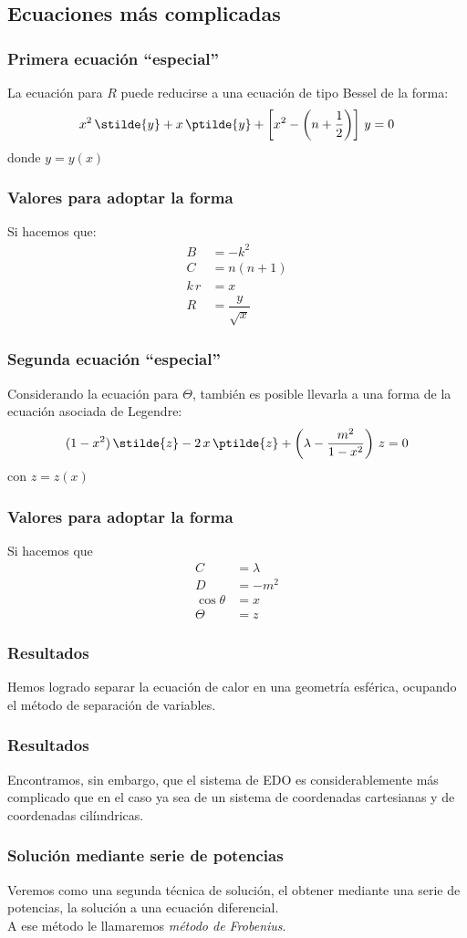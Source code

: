 \subsection{Ecuaciones más complicadas}
\begin{frame}
\frametitle{Primera ecuación \enquote{especial}}
La ecuación para $R$ puede reducirse a una ecuación de tipo Bessel de la forma:
\begin{align}
x^{2} \, \stilde{y} + x \, \ptilde{y} + \left[ x^{2} - \left( n + \dfrac{1}{2} \right) \right] \, y = 0
\label{eq:ecuacion_02_304}
\end{align}
donde $y = y(x)$
\end{frame}
\begin{frame}
\frametitle{Valores para adoptar la forma}
Si hacemos que:
\begin{align*}
B &= -k^{2} \\[0.5em]
C &= n(n + 1) \\[0.5em]
k \, r &= x \\[0.5em]
R &= \dfrac{y}{\sqrt{x}}
\end{align*}
\end{frame}
\begin{frame}
\frametitle{Segunda ecuación \enquote{especial}}
Considerando la ecuación para $\Theta$, también es posible llevarla a una forma de la ecuación asociada de Legendre:
\begin{align*}
(1 - x^{2}) \, \stilde{z} - 2 \, x \, \ptilde{z} + \left( \lambda - \dfrac{m^{2}}{1 -x^{2}} \right) \, z = 0
\label{eq:ecuacion_02_305}
\end{align*}
con $z = z(x)$
\end{frame}
\begin{frame}
\frametitle{Valores para adoptar la forma}
Si hacemos que
\begin{align*}
C &= \lambda \\[0.5em]
D &= - m^{2} \\[0.5em]
\cos \theta &= x \\[0.5em]
\Theta &= z
\end{align*}
\end{frame}
\begin{frame}
\frametitle{Resultados}
Hemos logrado separar la ecuación de calor en una geometría esférica, ocupando el método de separación de variables.
\end{frame}
\begin{frame}
\frametitle{Resultados}
Encontramos, sin embargo, que el sistema de EDO es considerablemente más complicado que en el caso ya sea de un sistema de coordenadas cartesianas y de  coordenadas cilíındricas.
\end{frame}
\begin{frame}
\frametitle{Solución mediante serie de potencias}
Veremos como una segunda técnica de solución, el obtener mediante una serie de potencias, la solución a una ecuación diferencial.
\\
\bigskip
\pause
A ese método le llamaremos \emph{método de Frobenius}.
\end{frame}
